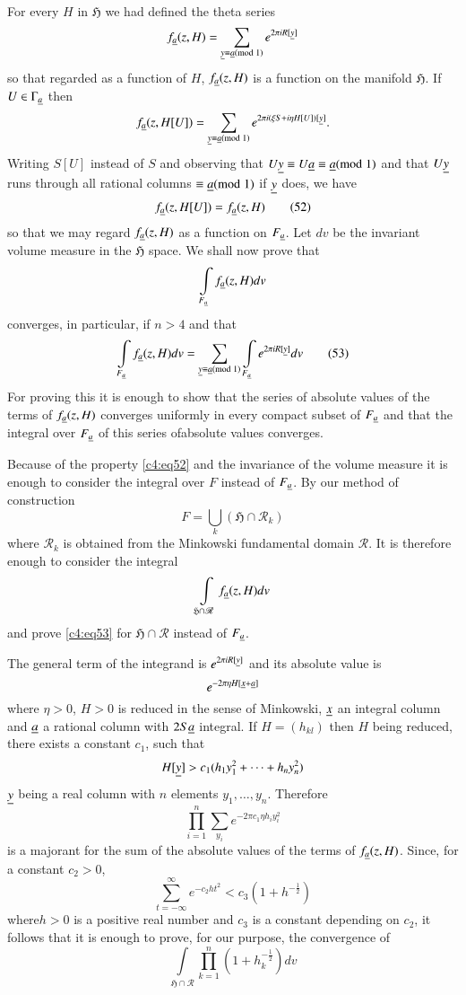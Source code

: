 For every $H$ in $\mathfrak{H}$ we had defined the theta series
$$
f_{\underline{a}}(z,H)=\sum_{\underline{y}\equiv \underline{a}(\rm{mod} \; 1)}e^{2\pi iR[\underline{y}]}
$$
so that regarded as a function of $H$, $f_{\underline{a}}(z,H)$ is a function
on the manifold $\mathfrak{H}$. If $U\in\Gamma_{\underline{a}}$ then
$$
f_{\underline{a}}(z,H[U])=\sum_{\underline{y}\equiv \underline{a}(\rm{mod} \; 1)}e^{2\pi i(\xi
  S+i\eta H[U])[\underline{y}]}.
$$
Writing $S[U]$ instead of $S$ and observing that $U\underline{y}\equiv
U\underline{a}\equiv \underline{a}(\rm{mod} \; 1)$ and that $U\underline{y}$ runs through all
rational columns $\equiv\underline{a}(\rm{mod} \; 1)$ if $\underline{y}$ does, we have
\begin{equation*}
f_{\underline{a}}(z,H[U])=f_{\underline{a}}(z,H)\tag{52}\label{c4:eq52}
\end{equation*}
so that we may regard $f_{\underline{a}}(z,H)$ as a function on
$F_{\underline{a}}$. Let $dv$ be the invariant volume measure in the
$\mathfrak{H}$ space. We shall now prove that
$$
\int\limits_{F_{\underline{a}}}f_{\underline{a}}(z,H)dv
$$
converges, in particular, if $n>4$ and that
\begin{equation*}
\int\limits_{F_{\underline{a}}}f_{\underline{a}}(z,H)dv=\sum_{\underline{y}\equiv
  \underline{a}(\rm{mod} \; 1)}\int\limits_{F_{\underline{a}}}e^{2\pi iR[\underline{y}]}dv\tag{53}\label{c4:eq53}
\end{equation*}
For proving this it is enough to show that the series of absolute
values of the terms of $f_{\underline{a}}(z,H)$ converges uniformly in every
compact subset of $F_{\underline{a}}$ and that the integral over $F_{\underline{a}}$
of this series of\pageoriginale absolute values converges.

Because of the property \eqref{c4:eq52} and the invariance of the volume
measure it is enough to consider the integral over $F$ instead of
$F_{\underline{a}}$. By our method of construction
$$
F=\bigcup_{k}(\mathfrak{H}\cap \mathscr{R}_{k})
$$
where $\mathscr{R}_{k}$ is obtained from the Minkowski fundamental
domain $\mathscr{R}$. It is therefore enough to consider the integral
$$
\int\limits_{\mathfrak{H}\cap \mathscr{R}}f_{\underline{a}}(z,H)dv
$$
and prove \eqref{c4:eq53} for $\mathfrak{H}\cap \mathscr{R}$ instead of
$F_{\underline{a}}$.

The general term of the integrand is $e^{2\pi iR[\underline{y}]}$ and its
  absolute value is
$$
e^{-2\pi \eta H[\underline{x}+\underline{a}]}
$$
where $\eta>0$, $H>0$ is reduced in the sense of Minkowski, $\underline{x}$
an integral column and $\underline{a}$ a rational column with $2S\underline{a}$
integral. If $H=(h_{kl})$ then $H$ being reduced, there exists a
constant $c_{1}$, such that
$$
H[\underline{y}]>c_{1}(h_{1}y^{2}_{1}+\cdots+h_{n}y^{2}_{n})
$$
$\underline{y}$ being a real column with $n$ elements
$y_{1},\ldots,y_{n}$. Therefore 
$$
\prod^{n}_{i=1}\sum_{y_{i}}e^{-2\pi c_{1}\eta h_{i}y_{i}^{2}}
$$
is a majorant for the sum of the absolute values of the terms of
$f_{\underline{a}}(z,H)$. Since, for a constant $c_{2}>0$,
$$
\sum^{\infty}_{t=-\infty}e^{-c_{2}ht^{2}}<c_{3}(1+h^{-\frac{1}{2}})
$$
where\pageoriginale $h>0$ is a positive real number and $c_{3}$ is a
constant depending on $c_{2}$, it follows that it is enough to prove,
for our purpose, the convergence of
\begin{equation*}
\int\limits_{\mathfrak{H}\cap\mathscr{R}}\prod^{n}_{k=1}(1+h^{-\frac{1}{2}}_{k})dv\tag{54}\label{c4:eq54} 
\end{equation*}

